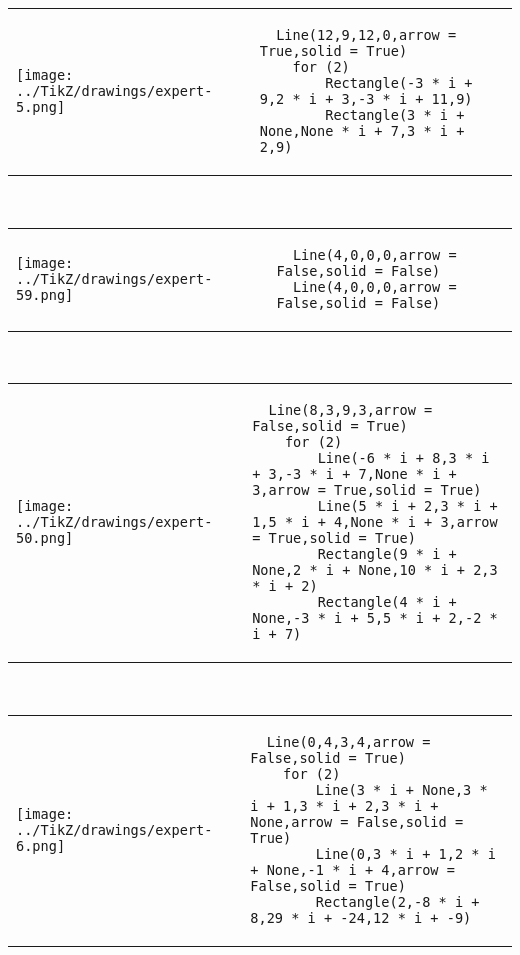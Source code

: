         \begin{tabular}{ll}
\texttt{[image: ../TikZ/drawings/expert-5.png]}&
        \begin{minipage}{10cm}
        \begin{verbatim}
  Line(12,9,12,0,arrow = True,solid = True)
    for (2)
        Rectangle(-3 * i + 9,2 * i + 3,-3 * i + 11,9)
        Rectangle(3 * i + None,None * i + 7,3 * i + 2,9)
        \end{verbatim}
\end{minipage}
\end{tabular}        
        \\

        \begin{tabular}{ll}
\texttt{[image: ../TikZ/drawings/expert-59.png]}&
        \begin{minipage}{10cm}
        \begin{verbatim}
  Line(4,0,0,0,arrow = False,solid = False)
  Line(4,0,0,0,arrow = False,solid = False)
        \end{verbatim}
\end{minipage}
\end{tabular}        
        \\

        \begin{tabular}{ll}
\texttt{[image: ../TikZ/drawings/expert-50.png]}&
        \begin{minipage}{10cm}
        \begin{verbatim}
  Line(8,3,9,3,arrow = False,solid = True)
    for (2)
        Line(-6 * i + 8,3 * i + 3,-3 * i + 7,None * i + 3,arrow = True,solid = True)
        Line(5 * i + 2,3 * i + 1,5 * i + 4,None * i + 3,arrow = True,solid = True)
        Rectangle(9 * i + None,2 * i + None,10 * i + 2,3 * i + 2)
        Rectangle(4 * i + None,-3 * i + 5,5 * i + 2,-2 * i + 7)
        \end{verbatim}
\end{minipage}
\end{tabular}        
        \\

        \begin{tabular}{ll}
\texttt{[image: ../TikZ/drawings/expert-6.png]}&
        \begin{minipage}{10cm}
        \begin{verbatim}
  Line(0,4,3,4,arrow = False,solid = True)
    for (2)
        Line(3 * i + None,3 * i + 1,3 * i + 2,3 * i + None,arrow = False,solid = True)
        Line(0,3 * i + 1,2 * i + None,-1 * i + 4,arrow = False,solid = True)
        Rectangle(2,-8 * i + 8,29 * i + -24,12 * i + -9)
        \end{verbatim}
\end{minipage}
\end{tabular}        
        